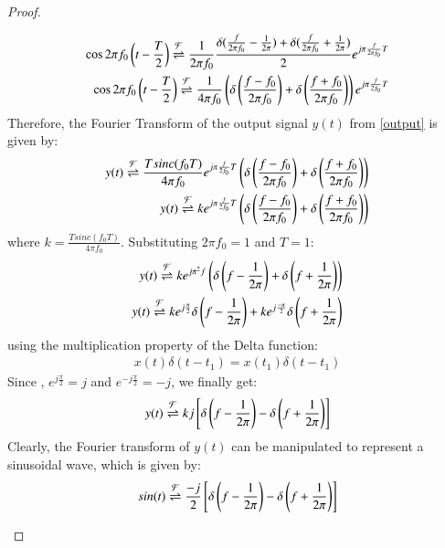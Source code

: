 \documentclass[journal,12pt,twocolumn]{IEEEtran}
\begin{document}
\begin{proof}
\begin{enumerate}
{\begin{align}
    \cos2\pi f_0\left(t - \frac{T}{2}\right) \overset{\mathcal{F}}{ \rightleftharpoons} \frac{1}{2\pi f_0}\frac{\delta(\frac{f}{2\pi f_0} - \frac{1}{2\pi}) + \delta(\frac{f}{2\pi f_0} + \frac{1}{2\pi})}{2} e^{j\pi \frac{f}{2\pi f_0}T}\\
    \cos 2\pi f_0\left(t - \frac{T}{2}\right) \overset{\mathcal{F}}{ \rightleftharpoons}\frac{1}{4\pi f_0}\left(\delta\left(\frac{f - f_0}{2\pi f_0}\right) + \delta\left(\frac{f + f_0}{2\pi f_0}\right)\right)e^{j\pi \frac{f}{2f_0}T}
\end{align}
}
Therefore, the Fourier Transform of the output signal $y(t)$ from \eqref{output} is given by:
 \begin{align}
     y(t) \overset{\mathcal{F}}{ \rightleftharpoons} \frac{Tsinc( f_0 T)}{4\pi f_0}e^{j\pi \frac{f}{2f_0}T}\left(\delta\left(\frac{f - f_0}{2\pi f_0}\right) + \delta\left(\frac{f + f_0}{2\pi f_0}\right)\right)\\
     y(t) \overset{\mathcal{F}}{ \rightleftharpoons} ke^{j\pi \frac{f}{2f_0}T}\left(\delta\left(\frac{f - f_0}{2\pi f_0}\right) + \delta\left(\frac{f + f_0}{2\pi f_0}\right)\right)
 \end{align}
 where $k = \frac{Tsinc( f_0T)}{4\pi f_0}$. Substituting $2\pi f_0 = 1$ and $T = 1$:
 \begin{align}
     y(t) \overset{\mathcal{F}}{ \rightleftharpoons} ke^{j\pi^2f}\left(\delta\left(f - \frac{1}{2\pi}\right) + \delta\left(f + \frac{1}{2\pi}\right)\right)\\
     y(t) \overset{\mathcal{F}}{ \rightleftharpoons} ke^{j\frac{\pi}{2}}\delta\left(f - \frac{1}{2\pi}\right) +ke^{j\frac{-\pi}{2}}\delta\left(f + \frac{1}{2\pi}\right)
 \end{align}
 using the multiplication property of the Delta function:
 \begin{align}
     x(t)\delta(t - t_1) = x(t_1)\delta(t - t_1)
 \end{align}
 Since , $e^{j\frac{\pi}{2}} = j$ and $e^{-j\frac{\pi}{2}} = -j$, we finally get:
 \begin{align}
 y(t) \overset{\mathcal{F}}{ \rightleftharpoons} kj{}\left[\delta\left(f - \frac{1}{2\pi}\right) - \delta\left(f + \frac{1}{2\pi}\right)\right]
 \end{align}
 Clearly, the Fourier transform of $y(t)$ can be manipulated to represent a  sinusoidal wave, which is given by:
 \begin{align}
     sin(t) \overset{\mathcal{F}}{ \rightleftharpoons} \frac{-j}{2}{}\left[\delta\left(f-\frac{1}{2\pi}\right) - \delta\left(f + \frac{1}{2\pi}\right)\right]
 \end{align}
\begin{figure}[!ht]
\centering

\end{figure}
\end{enumerate}
\end{proof}
\end{document}
